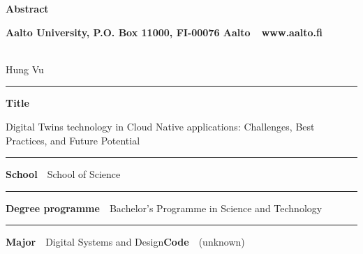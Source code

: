 
\newpage
{}
{}


\begin{spacing}{.88}

{\parindent0pt %

{\fontsize{13.9pt}{13.9pt}\selectfont
\vspace{-8.9mm}\hfill{\bfseries\sffamily\lsstyle Abstract}}

{\fontsize{9.48pt}{9.48pt}\selectfont
\vspace{.9mm}\hfill{\bfseries\sffamily\lsstyle Aalto University, P.O. Box 11000, FI-00076 Aalto~~\textcolor{aaltoGray}{www.aalto.fi}}}

\\
{\small Hung Vu}

\vspace{-2.4mm}\rule{\textwidth}{.75pt}

{\fontsize{10.5pt}{10.5pt}\bfseries\sffamily\lsstyle Title}\\
\parbox[t]{\textwidth}{\raggedright\small Digital Twins technology in Cloud Native applications: Challenges, Best Practices, and Future Potential}

\vspace{.5mm}\rule{\textwidth}{.75pt}

{\fontsize{10.5pt}{10.5pt}\bfseries\sffamily\lsstyle School}~~{\small School of Science}

\vspace{-2.4mm}\rule{\textwidth}{.75pt}

{\fontsize{10.5pt}{10.5pt}\bfseries\sffamily\lsstyle Degree programme}~~{\small Bachelor’s Programme in Science and Technology}

\vspace{-2.4mm}\rule{\textwidth}{.75pt}

{\fontsize{10.5pt}{10.5pt}\bfseries\sffamily\lsstyle Major}~~{\small Digital Systems and Design}\hfill{\fontsize{10.5pt}{10.5pt}\bfseries\sffamily\lsstyle Code}~~{\small (unknown)}

}
\end{spacing}
